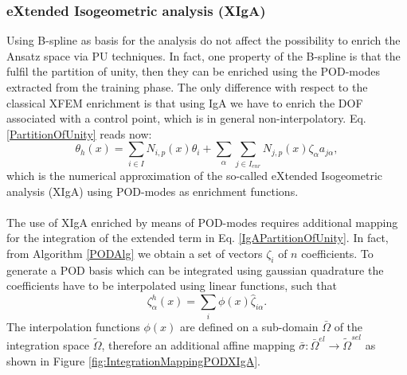 \documentclass[3p]{article}
\begin{document}
\subsubsection*{eXtended Isogeometric analysis (XIgA)}
Using B-spline as basis for the analysis do not affect the possibility to enrich the Ansatz space via PU techniques. In fact, one property of the B-spline is that the fulfil the partition of unity, then they can be enriched using the POD-modes extracted from the training phase. The only difference with respect to the classical XFEM enrichment is that using IgA we have to enrich the DOF associated with a control point, which is in general non-interpolatory. Eq. \ref{PartitionOfUnity} reads now:
\begin{equation}
\theta_{h}(x) = \sum_{i\in I} N_{i,p}(x)\theta_{i} + \sum_{\alpha}\sum_{j\in I_{enr}} N_{j,p}(x)\zeta_{\alpha}a_{j\alpha},
\label{IgAPartitionOfUnity}
\end{equation}
which is the numerical approximation of the so-called eXtended Isogeometric analysis (XIgA) using POD-modes as enrichment functions.\\
\\
\indent 
The use of XIgA enriched by means of POD-modes requires additional mapping for the integration of the extended term in Eq. \ref{IgAPartitionOfUnity}. In fact, from Algorithm \ref{PODAlg} we obtain a set of vectors $\zeta_{i}$ of $n$ coefficients. To generate a POD basis which can be integrated using gaussian quadrature the coefficients have to be interpolated using linear functions, such that
\begin{equation}
\zeta_{\alpha}^{h}(x) = \sum_{i}\phi(x)\hat{\zeta}_{i\alpha}.
\end{equation} 
The interpolation functions $\phi(x)$ are defined on a sub-domain $\bar{\Omega}$ of the integration space $\tilde{\Omega}$, therefore an additional affine mapping $\bar{\sigma}:\bar{\Omega}^{el}\rightarrow\tilde{\Omega}^{sel}$ as shown in Figure \ref{fig:IntegrationMappingPODXIgA}.
\end{document}

